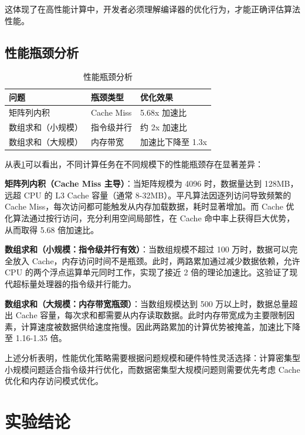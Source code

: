 \documentclass[11pt,a4paper]{article}
\begin{document}
这体现了在高性能计算中，开发者必须理解编译器的优化行为，才能正确评估算法性能。

\subsection{性能瓶颈分析}

\begin{table}[!htb]
\centering
\caption{性能瓶颈分析}
\label{tab:bottleneck}
\begin{tabular}{|l|l|l|}
\hline
\textbf{问题} & \textbf{瓶颈类型} & \textbf{优化效果} \\
\hline
矩阵列内积 & Cache Miss & 5.68x 加速比 \\
\hline
数组求和（小规模） & 指令级并行 & 约 2x 加速比 \\
\hline
数组求和（大规模） & 内存带宽 & 加速比下降至 1.3x \\
\hline
\end{tabular}
\end{table}

从表\ref{tab:bottleneck}可以看出，不同计算任务在不同规模下的性能瓶颈存在显著差异：

\textbf{矩阵列内积（Cache Miss 主导）}：当矩阵规模为 4096 时，数据量达到 128MB，远超 CPU 的 L3 Cache 容量（通常 8-32MB）。平凡算法因逐列访问导致频繁的 Cache Miss，每次访问都可能触发从内存加载数据，耗时显著增加。而 Cache 优化算法通过按行访问，充分利用空间局部性，在 Cache 命中率上获得巨大优势，从而取得 5.68 倍加速比。

\textbf{数组求和（小规模：指令级并行有效）}：当数组规模不超过 100 万时，数据可以完全放入 Cache，内存访问时间不是瓶颈。此时，两路累加通过减少数据依赖，允许 CPU 的两个浮点运算单元同时工作，实现了接近 2 倍的理论加速比。这验证了现代超标量处理器的指令级并行能力。

\textbf{数组求和（大规模：内存带宽瓶颈）}：当数组规模达到 500 万以上时，数据总量超出 Cache 容量，每次求和都需要从内存读取数据。此时内存带宽成为主要限制因素，计算速度被数据供给速度拖慢。因此两路累加的计算优势被掩盖，加速比下降至 1.16-1.35 倍。

上述分析表明，性能优化策略需要根据问题规模和硬件特性灵活选择：计算密集型小规模问题适合指令级并行优化，而数据密集型大规模问题则需要优先考虑 Cache 优化和内存访问模式优化。

\section{实验结论}
\end{document}
